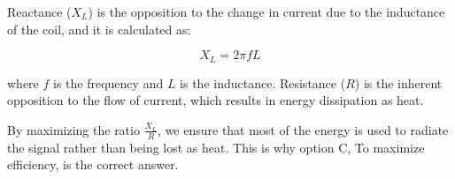 Reactance (\(X_L\)) is the opposition to the change in current due to the inductance of the coil, and it is calculated as:

\[
X_L = 2\pi f L
\]

where \(f\) is the frequency and \(L\) is the inductance. Resistance (\(R\)) is the inherent opposition to the flow of current, which results in energy dissipation as heat.

By maximizing the ratio \( \frac{X_L}{R} \), we ensure that most of the energy is used to radiate the signal rather than being lost as heat. This is why option C, To maximize efficiency, is the correct answer.

